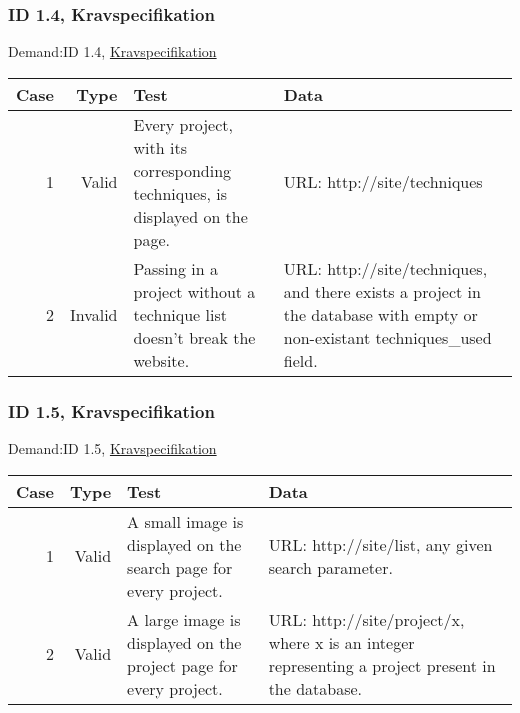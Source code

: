 \documentclass{TDP003mall}
\begin{document}
\subsubsection{ID 1.4, Kravspecifikation}
Demand:ID 1.4, \href{https://www.ida.liu.se/~TDP003/current/projekt/dokument/systemspecifikation.pdf}{Kravspecifikation}
\begin{table}[!h]
\begin{tabularx}{\linewidth}{|r|r|X|X|}\hline
\textbf{Case} &\textbf{Type} & \textbf{Test} & \textbf{Data} \\\hline
1 &Valid & Every project, with its corresponding techniques, is displayed on the page. & URL: http://site/techniques  \\\hline
2 &Invalid & Passing in a project without a technique list doesn't break the
website. & URL: http://site/techniques, and there exists a project in the database with empty or non-existant techniques\_used field. \\\hline
\end{tabularx}
\end{table}

\subsubsection{ID 1.5, Kravspecifikation}
Demand:ID 1.5, \href{https://www.ida.liu.se/~TDP003/current/projekt/dokument/systemspecifikation.pdf}{Kravspecifikation}
\begin{table}[!h]
\begin{tabularx}{\linewidth}{|r|r|X|X|}\hline
\textbf{Case} &\textbf{Type} & \textbf{Test} & \textbf{Data} \\\hline
1 &Valid & A small image is displayed on the search page for every project. & URL: http://site/list, any given search parameter. \\\hline
2 &Valid & A large image is displayed on the project page for every project. & URL: http://site/project/x, where x is an integer representing a project present in the database. \\\hline
\end{tabularx}
\end{table}
\newpage
\end{document}
